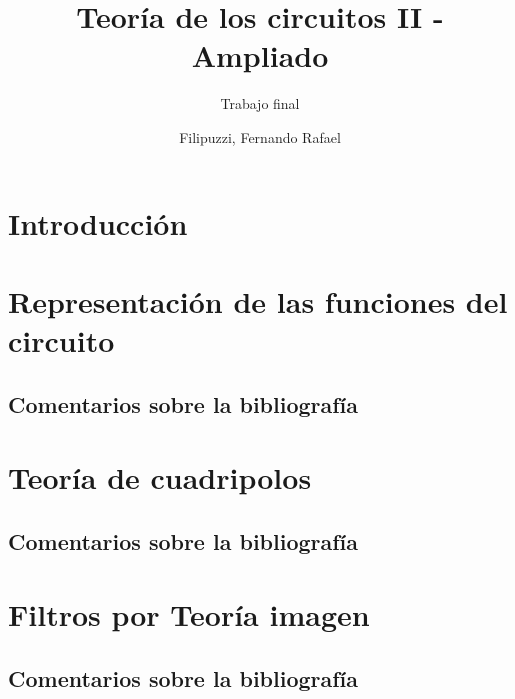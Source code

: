 \documentclass[oneside,a4paper,10pt]{scrbook}
\begin{document}
	\pagestyle{fancy}
	
	\fancyhead{}\fancyfoot{}

	
	\rfoot{ \thepage \hspace{1pt} - \pageref{LastPage}}
	
	\title{Teoría de los circuitos II - Ampliado}
	\subtitle{Trabajo final}
	\author{Filipuzzi, Fernando Rafael	}
	
	
	\maketitle
	
	\tableofcontents
	
	\listoffigures\newpage
   
%    
    
	\chapter{Introducción}
	{
		
	}
	
	\clearpage	
	
	\chapter{Representación de las funciones del circuito}
	{
		\section{Comentarios sobre la bibliografía}
   		{
    						
		}
	}	
	
    \clearpage	
	
	\chapter{Teoría de cuadripolos}
	{
		\section{Comentarios sobre la bibliografía}
   		{
    						
		}
	}	
	
	\clearpage
	
		
	\chapter{Filtros por Teoría imagen}
	{
		\section{Comentarios sobre la bibliografía}
   		{
    						
		}
	}	
	
\end{document}
